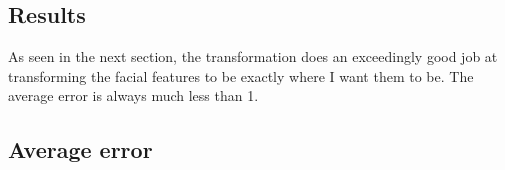 \documentclass[dvipsnames]{article}
\begin{document}
\subsection*{Results}
As seen in the next section, the transformation does an exceedingly good job at transforming the facial features to be exactly where I want them to be. The average error is always much less than 1.

\subsection*{Average error}
\lstset{style=out}

\end{document}
